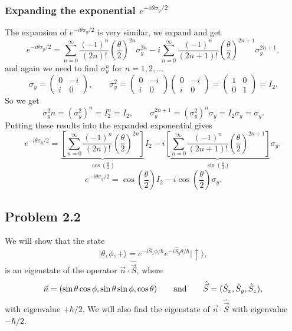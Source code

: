 \documentclass[a4paper, 11pt, titlepage, english]{article}
\newcommand{\ket}[1]{|#1 \rangle}
\newcommand{\op}[1]{\hat{#1}}
\newcommand{\up}{\left|\uparrow\rangle\right.}
\begin{document}
\subsubsection*{Expanding the exponential $e^{-i\theta\sigma_y/2}$}
The expansion of $e^{-i\theta\sigma_y/2}$ is very similar, we expand and get
$$e^{-i\theta\sigma_y/2} = \sum_{n=0}^\infty \frac{(-1)^{n}}{(2n)!}\left(\frac{\theta}{2}\right)^{2n}\sigma_y^{2n} - i\sum_{n=0}^\infty \frac{(-1)^{n}}{(2n+1)!}\left(\frac{\theta}{2}\right)^{2n+1}\sigma_y^{2n+1},$$
and again we need to find $\sigma_y^n$ for $n=1,2,\ldots$
$$\sigma_y = \begin{pmatrix}
0 & -i \\ i & 0 \end{pmatrix}, \qquad \sigma_y^2 = \begin{pmatrix}
0 & -i \\ i & 0 \end{pmatrix}\begin{pmatrix}
0 & -i \\ i & 0 \end{pmatrix} = \begin{pmatrix}
1 &0 \\ 0 & 1
\end{pmatrix} = I_2.
$$
So we get
$$\sigma_y^2n = \left(\sigma_y^2\right)^n = I_2^n = I_2, \qquad \sigma_y^{2n+1} = \left(\sigma_y^{2}\right)^n\sigma_y = I_2 \sigma_y = \sigma_y.$$
Putting these results into the expanded exponential gives
$$e^{-i\theta\sigma_y/2} = \underbrace{\left[\sum_{n=0}^\infty \frac{(-1)^{n}}{(2n)!}\left(\frac{\theta}{2}\right)^{2n}\right]}_{\cos\left(\frac{\theta}{2}\right)}I_2 - i\underbrace{\left[\sum_{n=0}^\infty \frac{(-1)^{n}}{(2n+1)!}\left(\frac{\theta}{2}\right)^{2n+1}\right]}_{\sin\left(\frac{\theta}{2}\right)}\sigma_y,$$
$$e^{-i\theta\sigma_y/2} = \cos\left(\frac{\theta}{2}\right)I_2 - i\cos\left(\frac{\theta}{2}\right)\sigma_y.$$

\subsection*{Problem 2.2}
We will show that the state 
$$\ket{\theta, \phi, +} = e^{-i\op{S}_z\phi/\hbar}e^{-i\op{S}_y\theta/\hbar}\up,$$
is an eigenstate of the operator $\vec{n}\cdot\op{\vec{S}}$, where
$$\vec n = (\sin \theta \cos \phi, \sin \theta \sin \phi, \cos \theta) \qquad {\rm and} \qquad \op{\vec{S}} = (\op{S}_x, \op{S}_y, \op{S}_z),$$
with eigenvalue $+\hbar/2$. We will also find the eigenstate of $\vec{n}\cdot\op{\vec{S}}$ with eigenvalue $-\hbar/2$.
\end{document}

